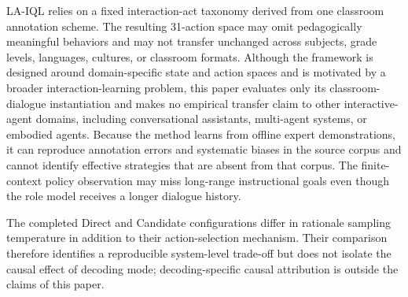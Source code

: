 \documentclass[manuscript,review,anonymous]{acmart}
\begin{document}
LA-IQL relies on a fixed interaction-act taxonomy derived from one classroom annotation scheme.
The resulting 31-action space may omit pedagogically meaningful behaviors and may not transfer unchanged across subjects, grade levels, languages, cultures, or classroom formats.
Although the framework is designed around domain-specific state and action
spaces and is motivated by a broader interaction-learning problem, this paper
evaluates only its classroom-dialogue instantiation and makes no empirical
transfer claim to other interactive-agent domains, including conversational
assistants, multi-agent systems, or embodied agents.
Because the method learns from offline expert demonstrations, it can reproduce annotation errors and systematic biases in the source corpus and cannot identify effective strategies that are absent from that corpus.
The finite-context policy observation may miss long-range instructional goals even though the role model receives a longer dialogue history.

The completed Direct and Candidate configurations differ in rationale sampling
temperature in addition to their action-selection mechanism. Their comparison
therefore identifies a reproducible system-level trade-off but does not isolate
the causal effect of decoding mode; decoding-specific causal attribution is
outside the claims of this paper.
\end{document}
